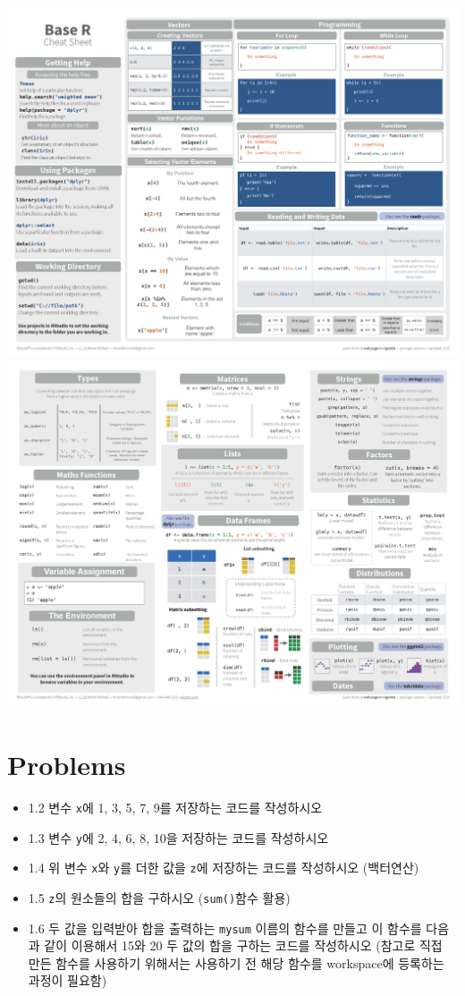 \documentclass[
]{book}
\begin{document}
\includegraphics{images/01/base-r_1.png}
\includegraphics{images/01/base-r_2.png}

\hypertarget{problems}{%
\section{Problems}\label{problems}}

\begin{itemize}
\item
  1.2 변수 \texttt{x}에 1, 3, 5, 7, 9를 저장하는 코드를 작성하시오
\item
  1.3 변수 \texttt{y}에 2, 4, 6, 8, 10을 저장하는 코드를 작성하시오
\item
  1.4 위 변수 \texttt{x}와 \texttt{y}를 더한 값을 \texttt{z}에 저장하는 코드를 작성하시오 (백터연산)
\item
  1.5 \texttt{z}의 원소들의 합을 구하시오 (\texttt{sum()}함수 활용)
\item
  1.6 두 값을 입력받아 합을 출력하는 \texttt{mysum} 이름의 함수를 만들고 이 함수를 다음과 같이 이용해서 15와 20 두 값의 합을 구하는 코드를 작성하시오 (참고로 직접 만든 함수를 사용하기 위해서는 사용하기 전 해당 함수를 workspace에 등록하는 과정이 필요함)
\end{itemize}
\end{document}
